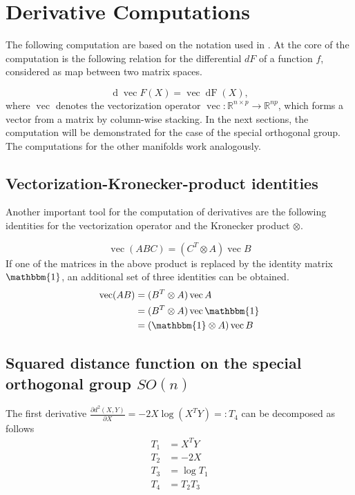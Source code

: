 \chapter{Derivative Computations}
\label{ap:derivative}

The following computation are based on the notation used in \cite{Magnus}. At the core of 
the computation is the following relation for the differential $dF$ of a function $f$, considered 
as map between two matrix spaces.

\begin{equation}
\mathop{d}\operatorname{vec} F(X) =\operatorname{vec}\mathop{dF}(X),
\end{equation}
where $\operatorname{vec}$ denotes the vectorization operator $\operatorname{vec}:\mathbb{R}^{n\times p} \to \mathbb{R}^{np}$, which forms a vector from a matrix by column-wise stacking. In the next sections, the computation will be demonstrated for the case
of the special orthogonal group. The computations for the other manifolds work analogously.


\section{Vectorization-Kronecker-product identities}
Another important tool for the computation of derivatives are the following identities
for the vectorization operator and the Kronecker product $\otimes$.

\begin{equation}
\operatorname{vec}(ABC)=(C^T \otimes A)\operatorname{vec} B
\end{equation}
If one of the matrices in the above product is replaced by the identity matrix $\mathbbm{1}$,
an additional set of three identities can be obtained.
\begin{align}
\operatorname{vec}(AB)	&=(B^T \otimes A)\operatorname{vec} A\\
						&=(B^T \otimes A)\operatorname{vec} \mathbbm{1}\\
						&=(\mathbbm{1} \otimes A)\operatorname{vec} B\\
\end{align}

\section{Squared distance function on the special orthogonal group $SO(n)$}
The first derivative $\frac{\partial d^2(X,Y)}{\partial X} = -2X\log(X^TY) =: T_4$ can be decomposed as follows
\begin{align}
T_1 &= X^TY \\
T_2 &= -2X \\	
T_3 &= \log T_1\\  
T_4 &= T_2 T_3
\end{align}


